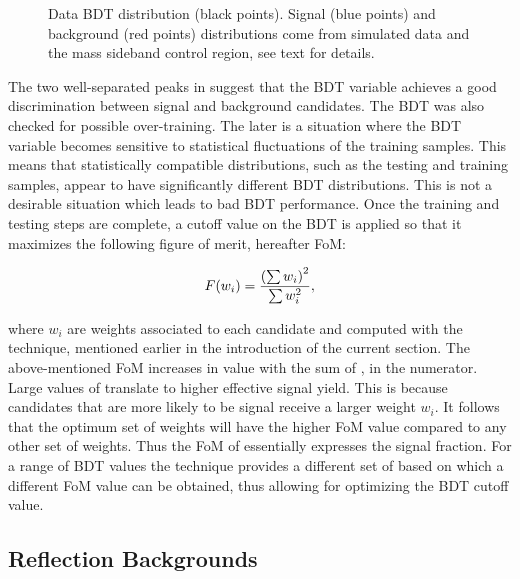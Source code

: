 \begin{figure}[!t]
\centering
  \scalebox{1}{}
  \caption{Data BDT distribution (black points). Signal (blue points) and background (red points) distributions
           come from simulated data and the \Bs mass sideband control region, see text for details.}
  \label{BTDG_performance}
\end{figure}


The two well-separated peaks in  suggest that the BDT variable achieves a good
discrimination between signal and background candidates. The BDT was also checked for possible over-training.
The later is a situation where the BDT variable becomes sensitive to statistical fluctuations of the training samples.
This means that statistically compatible distributions, such as the testing and training samples,
appear to have significantly different BDT distributions. This is not a desirable situation which leads to
bad BDT performance. Once the training and testing steps are complete, a cutoff value on the BDT is applied
so that it maximizes the following figure of merit, hereafter FoM:

\begin{equation}
  \centering
  F(w_i) = \frac{\left(\sum{w_{i}}\right)^2}{\sum{w_{i}^2}},
\label{eqn:fom}
\end{equation}

\noindent where $w_i$ are weights associated to each candidate and computed with the \sPlot technique, 
mentioned earlier in the introduction of the current section. The above-mentioned FoM increases in value with 
the sum of \sWeights, in the numerator. Large values of \sWeights translate to higher effective signal yield. 
This is because candidates that are more likely to be signal receive a larger weight $w_i$. It follows that the
optimum set of weights will have the higher FoM value compared to any other set of weights. Thus the FoM
of  essentially expresses the signal fraction. For a range of BDT values the \sPlot technique
provides a different set of \sWeights based on which a different FoM value can be obtained, thus allowing for
optimizing the BDT cutoff value.

\subsection{Reflection Backgrounds}
\label{peaking_backgrounds}

